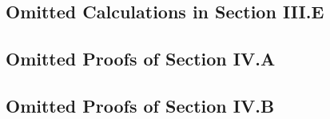 \documentclass[journal, 12pt, onecolumn]{IEEEtran}
\theoremstyle{plain}
\theoremstyle{definition}
\begin{document}
        

        \subsection{Omitted Calculations in Section III.E}

        

        \subsection{Omitted Proofs of Section IV.A}

        

        \subsection{Omitted Proofs of Section IV.B}

        




\end{document}
